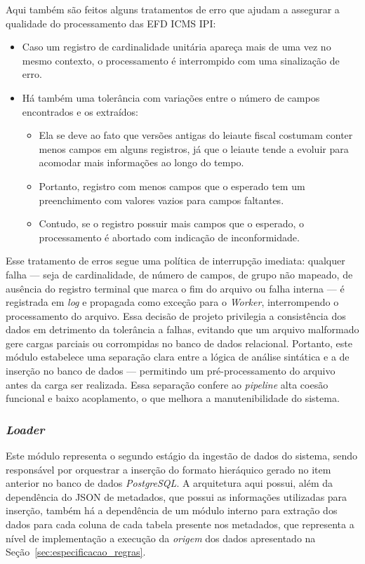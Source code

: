 Aqui também são feitos alguns tratamentos de erro que ajudam a assegurar a
qualidade do processamento das EFD ICMS IPI:
\begin{itemize}
    \item Caso um registro de cardinalidade unitária apareça mais de uma vez no
    mesmo contexto, o processamento é interrompido com uma sinalização de erro.
    \item Há também uma tolerância com variações entre o número de campos
    encontrados e os extraídos:
    \begin{itemize}
        \item Ela se deve ao fato que versões antigas do leiaute fiscal
        costumam conter menos campos em alguns registros, já que o leiaute
        tende a evoluir para acomodar mais informações ao longo do tempo.
        \item Portanto, registro com menos campos que o esperado tem um
        preenchimento com valores vazios para campos faltantes.
        \item Contudo, se o registro possuir mais campos que o esperado, o
        processamento é abortado com indicação de inconformidade.
    \end{itemize}
\end{itemize}
Esse tratamento de erros segue uma política de interrupção imediata: qualquer
falha --- seja de cardinalidade, de número de campos, de grupo não mapeado, de
ausência do registro terminal que marca o fim do arquivo ou falha interna --- é
registrada em \textit{log} e propagada como exceção para o \textit{Worker},
interrompendo o processamento do arquivo. Essa decisão de projeto privilegia a
consistência dos dados em detrimento da tolerância a falhas, evitando que um
arquivo malformado gere cargas parciais ou corrompidas no banco de dados
relacional.
Portanto, este módulo estabelece uma separação clara entre a lógica de análise
sintática e a de inserção no banco de dados --- permitindo um pré-processamento
do arquivo antes da carga ser realizada. Essa separação confere ao
\textit{pipeline} alta coesão funcional e baixo acoplamento, o que melhora a
manutenibilidade do sistema.

\subsubsection{\textit{Loader}}
Este módulo representa o segundo estágio da ingestão de dados do sistema, sendo
responsável por orquestrar a inserção do formato hieráquico gerado no item
anterior no banco de dados \textit{PostgreSQL}. A arquitetura aqui possui,
além da dependência do JSON de metadados, que possui as informações utilizadas
para inserção, também há a dependência de um módulo interno para extração dos
dados para cada coluna de cada tabela presente nos metadados, que representa a
nível de implementação a execução da \textit{origem} dos dados apresentado
na Seção~\ref{sec:especificacao_regras}.

